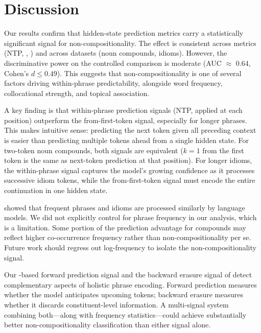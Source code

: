 \section{Discussion}
\label{sec:discussion}

Our results confirm that hidden-state prediction metrics carry a statistically significant signal for non-compositionality.
The effect is consistent across metrics (NTP, \logitlens, \futurelens) and across datasets (\farahmand noun compounds, \idiomem idioms).
However, the discriminative power on the controlled \farahmand comparison is moderate (AUC $\approx$ 0.64, Cohen's $d \leq 0.49$).
This suggests that non-compositionality is one of several factors driving within-phrase predictability, alongside word frequency, collocational strength, and topical association.

A key finding is that within-phrase prediction signals (NTP, \logitlens applied at each position) outperform the from-first-token \futurelens signal, especially for longer phrases.
This makes intuitive sense: predicting the next token given all preceding context is easier than predicting multiple tokens ahead from a single hidden state.
For two-token noun compounds, both signals are equivalent (\futurelens $k{=}1$ from the first token is the same as next-token prediction at that position).
For longer idioms, the within-phrase signal captures the model's growing confidence as it processes successive idiom tokens, while the from-first-token signal must encode the entire continuation in one hidden state.

\citet{rambelli2023frequent} showed that frequent \comp phrases and idioms are processed similarly by language models.
We did not explicitly control for phrase frequency in our analysis, which is a limitation.
Some portion of the prediction advantage for \noncomp compounds may reflect higher co-occurrence frequency rather than non-compositionality per se.
Future work should regress out log-frequency to isolate the non-compositionality signal.

Our \futurelens-based forward prediction signal and the backward erasure signal of \citet{feucht2024token} detect complementary aspects of holistic phrase encoding.
Forward prediction measures whether the model anticipates upcoming tokens; backward erasure measures whether it discards constituent-level information.
A multi-signal system combining both---along with frequency statistics---could achieve substantially better non-compositionality classification than either signal alone.

